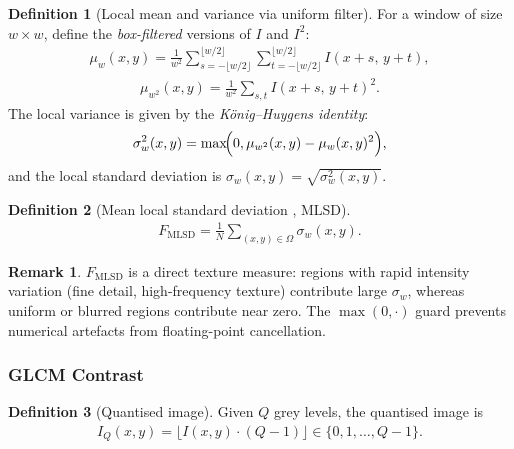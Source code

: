 \documentclass[12pt, xcolor=dvipsnames,svgnames,x11names]{article}
\theoremstyle{definition}
\newtheorem{definition}{Definition}[section]
\newtheorem{remark}{Remark}[section]
\begin{document}
\begin{definition}[Local mean and variance via uniform filter]
For a window of size $w \times w$, define the \emph{box-filtered} versions
of $I$ and $I^2$:
\begin{align*}
  \mu_w(x,y) =
  \frac{1}{w^2}\sum_{s=-\lfloor w/2\rfloor}^{\lfloor w/2\rfloor}
               \sum_{t=-\lfloor w/2\rfloor}^{\lfloor w/2\rfloor}
               I(x+s,\, y+t),
\end{align*}
\begin{align*}
  \mu_{w^2}(x,y) =
  \frac{1}{w^2}\sum_{s,t} I(x+s,\, y+t)^2.
\end{align*}
The local variance is given by the \emph{König–Huygens identity}:
\begin{align*}
  \sigma_w^2(x,y) =
  \max\!\Bigl(0, \mu_{w^2}(x,y) - \mu_w(x,y)^2\Bigr),
\end{align*}
and the local standard deviation is $\sigma_w(x,y) = \sqrt{\sigma_w^2(x,y)}$.
\end{definition}

\begin{definition}[Mean local standard deviation ,  MLSD]
\begin{align*}
  \boxed{F_{\mathrm{MLSD}} =
    \frac{1}{N}\sum_{(x,y)\in\Omega} \sigma_w(x,y).}
\end{align*}
\end{definition}

\begin{remark}
$F_{\mathrm{MLSD}}$ is a direct texture measure: regions with rapid
intensity variation (fine detail, high-frequency texture) contribute large
$\sigma_w$, whereas uniform or blurred regions contribute near zero.
The $\max(0,\cdot)$ guard prevents numerical artefacts from floating-point
cancellation.
\end{remark}

\subsubsection{GLCM Contrast}

\begin{definition}[Quantised image]
Given $Q$ grey levels, the quantised image is
\begin{align*}
  I_Q(x,y) = \bigl\lfloor I(x,y)\cdot(Q-1)\bigr\rfloor \in \{0,1,\ldots,Q-1\}.
\end{align*}
\end{definition}
\end{document}
